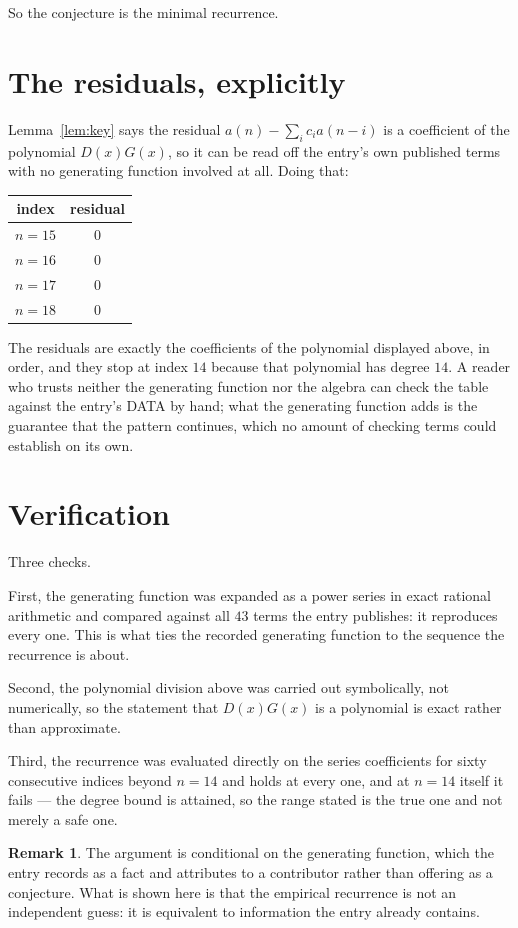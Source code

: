 \documentclass[11pt,a4paper]{article}
\theoremstyle{plain}
\theoremstyle{definition}
\newtheorem{remark}[theorem]{Remark}
\begin{document}
So the conjecture is the minimal recurrence.

\section{The residuals, explicitly}

Lemma~\ref{lem:key} says the residual $a(n)-\sum_ic_ia(n-i)$ is a coefficient of the
polynomial $D(x)G(x)$, so it can be read off the entry's own published terms with no
generating function involved at all. Doing that:
\begin{center}
\begin{tabular}{cc}
index & residual \\ \hline
$n=15$ & $0$ \\
$n=16$ & $0$ \\
$n=17$ & $0$ \\
$n=18$ & $0$
\end{tabular}
\end{center}
The residuals are exactly the coefficients of the polynomial displayed above, in order, and
they stop at index $14$ because that polynomial has degree $14$. A reader who trusts
neither the generating function nor the algebra can check the table against the entry's DATA
by hand; what the generating function adds is the guarantee that the pattern continues, which
no amount of checking terms could establish on its own.

\section{Verification}

Three checks.

First, the generating function was expanded as a power series in exact rational arithmetic and
compared against all $43$ terms the entry publishes: it reproduces every one. This is
what ties the recorded generating function to the sequence the recurrence is about.

Second, the polynomial division above was carried out symbolically, not numerically, so the
statement that $D(x)G(x)$ is a polynomial is exact rather than approximate.

Third, the recurrence was evaluated directly on the series coefficients for sixty consecutive
indices beyond $n=14$ and holds at every one, and at $n=14$ itself it fails --- the
degree bound is attained, so the range stated is the true one and not merely a safe one.

\begin{remark}
The argument is conditional on the generating function, which the entry records as a fact and
attributes to a contributor rather than offering as a conjecture. What is shown here is that
the empirical recurrence is not an independent guess: it is equivalent to information the
entry already contains.
\end{remark}
\end{document}
